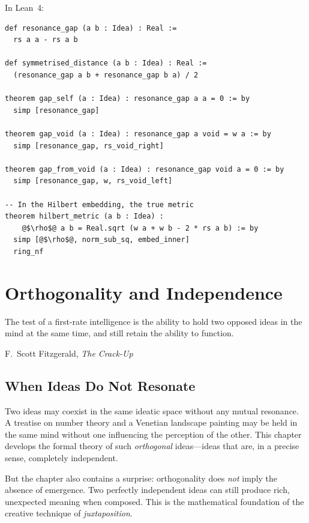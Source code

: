 In Lean~4:

\begin{lstlisting}
def resonance_gap (a b : Idea) : Real :=
  rs a a - rs a b

def symmetrised_distance (a b : Idea) : Real :=
  (resonance_gap a b + resonance_gap b a) / 2

theorem gap_self (a : Idea) : resonance_gap a a = 0 := by
  simp [resonance_gap]

theorem gap_void (a : Idea) : resonance_gap a void = w a := by
  simp [resonance_gap, rs_void_right]

theorem gap_from_void (a : Idea) : resonance_gap void a = 0 := by
  simp [resonance_gap, w, rs_void_left]

-- In the Hilbert embedding, the true metric
theorem hilbert_metric (a b : Idea) :
    @$\rho$@ a b = Real.sqrt (w a + w b - 2 * rs a b) := by
  simp [@$\rho$@, norm_sub_sq, embed_inner]
  ring_nf
\end{lstlisting}


\chapter{Orthogonality and Independence}
\label{ch:orthogonality}

\epigraph{The test of a first-rate intelligence is the ability to hold two
opposed ideas in the mind at the same time, and still retain the ability to
function.}{F.~Scott Fitzgerald, \textit{The Crack-Up}}

\section{When Ideas Do Not Resonate}

Two ideas may coexist in the same ideatic space without any mutual resonance.
A treatise on number theory and a Venetian landscape painting may be held in
the same mind without one influencing the perception of the other.  This
chapter develops the formal theory of such \emph{orthogonal}
ideas---ideas that are, in a precise sense, completely independent.

But the chapter also contains a surprise: orthogonality does \emph{not} imply
the absence of emergence.  Two perfectly independent ideas can still produce
rich, unexpected meaning when composed.  This is the mathematical foundation
of the creative technique of \emph{juxtaposition}.

